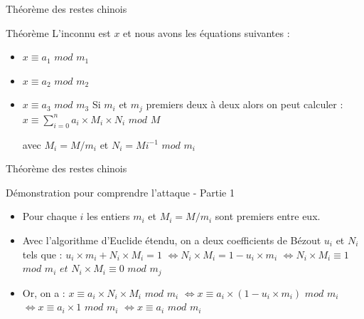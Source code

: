 \documentclass{beamer}
\begin{document}
	\begin{frame}{Théorème des restes chinois}
		\begin{block}{Théorème}
				L'inconnu est $x$ et nous avons les équations suivantes :
				\begin{itemize}
				\item $x \equiv a_1$ $mod$ $m_1$
				\item $x \equiv a_2$ $mod$ $m_2$
				\item $x \equiv a_3$ $mod$ $m_3$
				Si $m_i$ et $m_j$ premiers deux à deux alors on peut calculer : \newline
				\color{red}$x \equiv \sum \limits_{i=0}^{n}a_i \times M_i \times N_i$ $mod$ $M$ \color{black}
				
				avec $M_i=M / m_{i}$ et $N_i = Mi^{-1}$ $mod$ $m_i$
			\end{itemize}
		\end{block}
	\end{frame}

	\begin{frame}{Théorème des restes chinois}
	\begin{alertblock}{Démonstration pour comprendre l'attaque - Partie 1}
		\begin{itemize}
		\item Pour chaque $i$ les entiers $m_i$ et $M_i=M/m_i$ sont premiers entre eux.
		\item Avec l'algorithme d'Euclide étendu, on a deux coefficients de Bézout $u_i$ et $N_i$ tels que : 
		$u_i\times m_i + N_i\times M_i = 1$ \newline $\Leftrightarrow N_i \times M_i = 1 - u_i \times m_i$ \newline $\Leftrightarrow N_i \times M_i \equiv 1$ $mod$ $m_i$ $et$ $N_i \times M_i \equiv 0$ $mod$ $m_j$
		\item Or, on a : $x \equiv a_i \times N_i \times M_i$ $mod$ $m_i$ \newline $\Leftrightarrow x \equiv a_i \times (1 - u_i \times m_i)$ $mod$ $m_i$ \newline
		$\Leftrightarrow x \equiv a_i \times 1$ $mod$ $m_i$ \newline
		$\Leftrightarrow x \equiv a_i$ $mod$ $m_i$
		\end{itemize}
	\end{alertblock}
	\end{frame}
\end{document}
